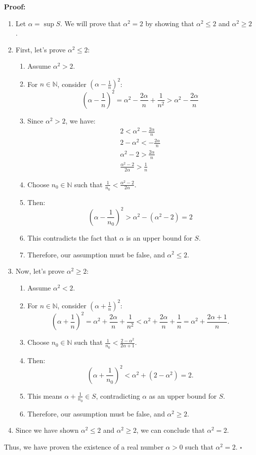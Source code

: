 \documentclass{article}
\begin{document}
\textbf{Proof:}
\begin{enumerate}
    \item Let $\alpha = \sup S$. We will prove that $\alpha^2 = 2$ by showing that $\alpha^2 \leq 2$ and $\alpha^2 \geq 2$.
    \item First, let's prove $\alpha^2 \leq 2$:
    \begin{enumerate}
        \item Assume $\alpha^2 > 2$.
        \item For $n \in \mathbb{N}$, consider $(\alpha - \frac{1}{n})^2$:
        $$
        \left( \alpha-\frac{1}{n} \right)^2=\alpha^2-\frac{2\alpha}{n}+\frac{1}{n^2}>\alpha^2-\frac{2\alpha}{n}
        $$
        \item Since $\alpha^2 > 2$, we have:
        \begin{align}
        2<\alpha^2-\frac{2\alpha}{n} \\
        2-\alpha^2<-\frac{2\alpha}{n} \\
        \alpha^2-2> \frac{2\alpha}{n} \\
        \frac{\alpha^2-2}{2\alpha}> \frac{1}{n}
        \end{align}
        \item Choose $n_0 \in \mathbb{N}$ such that $\frac{1}{n_0} < \frac{\alpha^2-2}{2\alpha}$.
        \item Then:
        $$
        \left( \alpha-\frac{1}{n_0} \right)^2>\alpha^2-(\alpha^2-2)=2
        $$
        \item This contradicts the fact that $\alpha$ is an upper bound for $S$.
        \item Therefore, our assumption must be false, and $\alpha^2 \leq 2$.
    \end{enumerate}
    \item Now, let's prove $\alpha^2 \geq 2$:
    \begin{enumerate}
        \item Assume $\alpha^2 < 2$.
        \item For $n \in \mathbb{N}$, consider $(\alpha + \frac{1}{n})^2$:
        $$
        \left( \alpha + \frac{1}{n} \right)^2 = \alpha^2 + \frac{2\alpha}{n} + \frac{1}{n^2} < \alpha^2 + \frac{2\alpha}{n} + \frac{1}{n} = \alpha^2 + \frac{2\alpha + 1}{n}.
        $$
        \item Choose $n_0 \in \mathbb{N}$ such that $\frac{1}{n_0} < \frac{2 - \alpha^2}{2\alpha + 1}$.
        \item Then:
        $$
        \left( \alpha + \frac{1}{n_0} \right)^2 < \alpha^2 + (2 - \alpha^2) = 2.
        $$
        \item This means $\alpha + \frac{1}{n_0} \in S$, contradicting $\alpha$ as an upper bound for $S$.
        \item Therefore, our assumption must be false, and $\alpha^2 \geq 2$.
    \end{enumerate}
    \item Since we have shown $\alpha^2 \leq 2$ and $\alpha^2 \geq 2$, we can conclude that $\alpha^2 = 2$.
\end{enumerate}

Thus, we have proven the existence of a real number $\alpha > 0$ such that $\alpha^2 = 2$. $\square$
\end{document}
